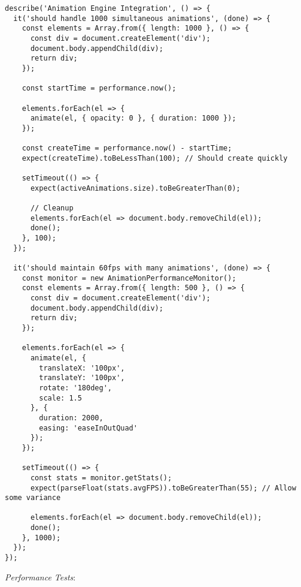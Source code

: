 \documentclass[11pt]{article}
\begin{document}
\begin{verbatim}
describe('Animation Engine Integration', () => {
  it('should handle 1000 simultaneous animations', (done) => {
    const elements = Array.from({ length: 1000 }, () => {
      const div = document.createElement('div');
      document.body.appendChild(div);
      return div;
    });
    
    const startTime = performance.now();
    
    elements.forEach(el => {
      animate(el, { opacity: 0 }, { duration: 1000 });
    });
    
    const createTime = performance.now() - startTime;
    expect(createTime).toBeLessThan(100); // Should create quickly
    
    setTimeout(() => {
      expect(activeAnimations.size).toBeGreaterThan(0);
      
      // Cleanup
      elements.forEach(el => document.body.removeChild(el));
      done();
    }, 100);
  });
  
  it('should maintain 60fps with many animations', (done) => {
    const monitor = new AnimationPerformanceMonitor();
    const elements = Array.from({ length: 500 }, () => {
      const div = document.createElement('div');
      document.body.appendChild(div);
      return div;
    });
    
    elements.forEach(el => {
      animate(el, { 
        translateX: '100px',
        translateY: '100px',
        rotate: '180deg',
        scale: 1.5
      }, { 
        duration: 2000,
        easing: 'easeInOutQuad'
      });
    });
    
    setTimeout(() => {
      const stats = monitor.getStats();
      expect(parseFloat(stats.avgFPS)).toBeGreaterThan(55); // Allow some variance
      
      elements.forEach(el => document.body.removeChild(el));
      done();
    }, 1000);
  });
});
\end{verbatim}

\emph{Performance Tests}:
\end{document}
